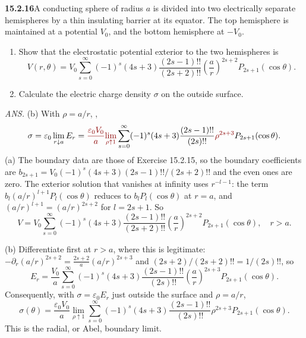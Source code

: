 \par\bigskip
\noindent\textbf{15.2.16}\quad A conducting sphere of radius $a$ is
divided into two electrically separate hemispheres by a thin
insulating barrier at its equator. The top hemisphere is maintained
at a potential $V_{0}$, and the bottom hemisphere at $-V_{0}$.
\begin{enumerate}
\item[(a)] Show that the electrostatic potential exterior to the two
hemispheres is
\[
V(r,\theta)=V_{0}\sum_{s=0}^{\infty}(-1)^{s}(4s+3)
\frac{(2s-1)!!}{(2s+2)!!}\left(\frac{a}{r}\right)^{2s+2}
P_{2s+1}(\cos\theta).
\]
\item[(b)] Calculate the electric charge density $\sigma$ on the
outside surface. 
\end{enumerate}
\par\nobreak\hfill\emph{ANS.}\enspace
(b) With $\rho=a/r$, ,
\[
\sigma=\varepsilon_0\lim_{r\downarrow a}E_r
=\erratum{\frac{\varepsilon_0V_0}{a}}
\erratum{\lim_{\rho\uparrow1}}\sum_{s=0}^{\infty}(-1)^s(4s+3)
\frac{(2s-1)!!}{(2s)!!}\erratum{\rho^{2s+3}}P_{2s+1}(\cos\theta).
\]
\solution
(a) The boundary data are those of Exercise 15.2.15, so the boundary
coefficients are
$b_{2s+1}=V_0(-1)^s(4s+3)(2s-1)!!/(2s+2)!!$ and the even ones
are zero. The exterior solution that vanishes at infinity uses
$r^{-l-1}$: the term $b_l(a/r)^{l+1}P_l(\cos\theta)$ reduces to
$b_lP_l(\cos\theta)$ at $r=a$, and $(a/r)^{l+1}=(a/r)^{2s+2}$ for
$l=2s+1$. So
\[
\boxed{V=V_0\sum_{s=0}^\infty(-1)^s(4s+3)
\frac{(2s-1)!!}{(2s+2)!!}
\left(\frac ar\right)^{2s+2}P_{2s+1}(\cos\theta)},\quad r>a.
\]

(b) Differentiate first at $r>a$, where this is legitimate:
$-\partial_r(a/r)^{2s+2}=\frac{2s+2}a(a/r)^{2s+3}$ and
$(2s+2)/(2s+2)!!=1/(2s)!!$, so
\[
E_r=\frac{V_0}{a}\sum_{s=0}^\infty(-1)^s(4s+3)
\frac{(2s-1)!!}{(2s)!!}
\left(\frac ar\right)^{2s+3}P_{2s+1}(\cos\theta).
\]
Consequently, with $\sigma=\varepsilon_0E_r$ just outside the
surface and $\rho=a/r$,
\[
\boxed{\sigma(\theta)=\frac{\varepsilon_0V_0}{a}
\lim_{\rho\uparrow1}\sum_{s=0}^\infty(-1)^s(4s+3)
\frac{(2s-1)!!}{(2s)!!}\rho^{2s+3}P_{2s+1}(\cos\theta)}.
\]
This is the radial, or Abel, boundary limit.

